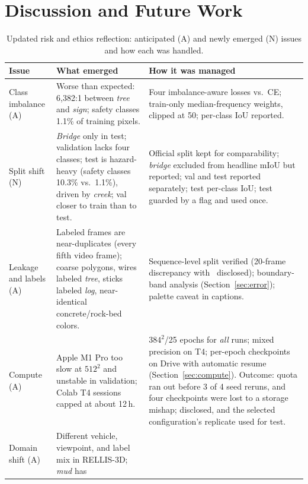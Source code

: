 \section{Discussion and Future Work}
\label{sec:discussion}

\begin{table}[t]
  \centering
  \caption{Updated risk and ethics reflection: anticipated (A) and newly emerged (N) issues and how each was handled.}
  \label{tab:risks}
  \footnotesize
  \begin{tabular}{@{}p{2.9cm} p{6.7cm} p{7.2cm}@{}}
    \toprule
    Issue & What emerged & How it was managed \\
    \midrule
    Class imbalance (A) &
      Worse than expected: 6,382:1 between \emph{tree} and \emph{sign};
      safety classes 1.1\% of training pixels. &
      Four imbalance-aware losses vs.\ CE; train-only median-frequency weights,
      clipped at 50; per-class IoU reported. \\
    Split shift (N) &
      \emph{Bridge} only in test; validation lacks four classes; test is
      hazard-heavy (safety classes 10.3\% vs.\ 1.1\%), driven by \emph{creek};
      val closer to train than to test. &
      Official split kept for comparability; \emph{bridge} excluded from headline
      mIoU but reported; val and test reported separately; test per-class IoU;
      test guarded by a flag and used once. \\
    Leakage and labels (A) &
      Labeled frames are near-duplicates (every fifth video frame); coarse
      polygons, wires labeled \emph{tree}, sticks labeled \emph{log},
      near-identical concrete/rock-bed colors. &
      Sequence-level split verified (20-frame discrepancy with~\cite{wigness2019rugd}
      disclosed); boundary-band analysis (Section~\ref{sec:error}); palette
      caveat in captions. \\
    Compute (A) &
      Apple M1 Pro too slow at $512^2$ and unstable in validation; Colab T4
      sessions capped at about 12\,h. &
      $384^2$/25 epochs for \emph{all} runs; mixed precision on T4; per-epoch
      checkpoints on Drive with automatic resume (Section~\ref{sec:compute}).
      Outcome: quota ran out before 3 of 4 seed reruns, and four checkpoints
      were lost to a storage mishap; disclosed, and the selected configuration's
      replicate used for test. \\
    Domain shift (A) &
      Different vehicle, viewpoint, and label mix in RELLIS-3D; \emph{mud} has

\end{tabular}
\end{table}
